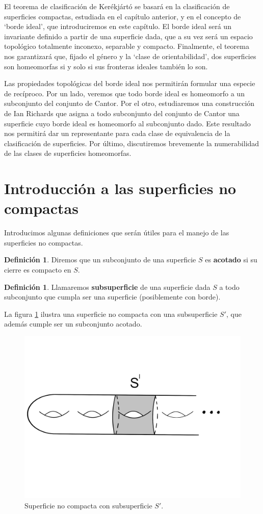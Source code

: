 \documentclass[a4paper,11pt,spanish, twoside, leqno]{tfg-uam}
\theoremstyle{definition}
\newtheorem{defin}[teor]{Definici\'on}
\begin{document}
El teorema de clasificación de Kerékjártó se basará en la clasificación de superficies compactas, estudiada en el capítulo anterior, y en el concepto de `borde ideal', que introduciremos en este capítulo. El borde ideal será un invariante  definido a partir de una superficie dada, que a su vez será un espacio topológico totalmente inconexo, separable y compacto. Finalmente, el teorema nos garantizará que, fijado el género y la `clase de orientabilidad', dos superficies son homeomorfas si y solo si sus fronteras ideales también lo son.

Las propiedades topológicas del borde ideal nos permitirán formular una especie de recíproco. Por un lado, veremos que todo borde ideal es homeomorfo a un subconjunto del conjunto de Cantor. Por el otro, estudiaremos una construcción de Ian Richards que  asigna a todo subconjunto del conjunto de Cantor una superficie cuyo borde ideal es homeomorfo al subconjunto dado. Este resultado nos permitirá dar un representante para cada clase de equivalencia de la clasificación de superficies. Por último, discutiremos brevemente la numerabilidad de las clases de superficies homeomorfas. 


\section{Introducción a las superficies no compactas}
Introducimos algunas definiciones que serán útiles para el manejo de las superficies no compactas.

\begin{defin}
Diremos que un subconjunto de una superficie $S$ es \textbf{acotado} si su cierre es compacto en $S$.
\end{defin}

\begin{defin}
Llamaremos \textbf{subsuperficie} de una superficie dada $S$ a todo subconjunto que cumpla ser una superficie (posiblemente con borde).
\end{defin} 

La figura \ref{fig:ejemplonocompacto} ilustra una superficie no compacta con una subsuperficie $S'$, que además cumple ser un subconjunto acotado. 


\begin{figure}[h!]
	\centering	\includegraphics[width=0.5\linewidth]{imagenes/ejemplonocompacta.png}
	\caption{Superficie no compacta con subsuperficie $S'$.}
	\label{fig:ejemplonocompacto}
\end{figure}
\end{document}
